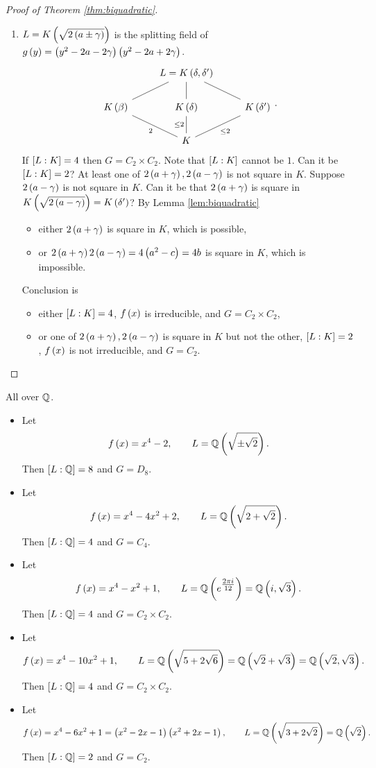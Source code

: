 \begin{proof}[Proof of Theorem \ref{thm:biquadratic}]
\begin{enumerate}
\item $ L = K\rb{\sqrt{2\rb{a \pm \gamma}}} $ is the splitting field of $ g\rb{y} = \rb{y^2 - 2a - 2\gamma}\rb{y^2 - 2a + 2\gamma} $.
$$
\begin{tikzcd}
& L = K\rb{\delta, \delta'} & \\
K\rb{\beta} \arrow[dash]{ur} & K\rb{\delta} \arrow[dash]{u} & K\rb{\delta'} \arrow[dash, swap]{ul} \\
& K \arrow[dash]{ul}{2} \arrow[dash]{u}{\le 2} \arrow[dash, swap]{ur}{\le 2} &
\end{tikzcd}.
$$
If $ \sb{L : K} = 4 $ then $ G = C_2 \times C_2 $. Note that $ \sb{L : K} $ cannot be $ 1 $. Can it be $ \sb{L : K} = 2 $? At least one of $ 2\rb{a + \gamma}, 2\rb{a - \gamma} $ is not square in $ K $. Suppose $ 2\rb{a - \gamma} $ is not square in $ K $. Can it be that $ 2\rb{a + \gamma} $ is square in $ K\rb{\sqrt{2\rb{a - \gamma}}} = K\rb{\delta'} $? By Lemma \ref{lem:biquadratic}
\begin{itemize}
\item either $ 2\rb{a + \gamma} $ is square in $ K $, which is possible,
\item or $ 2\rb{a + \gamma}2\rb{a - \gamma} = 4\rb{a^2 - c} = 4b $ is square in $ K $, which is impossible.
\end{itemize}
Conclusion is
\begin{itemize}
\item either $ \sb{L : K} = 4 $, $ f\rb{x} $ is irreducible, and $ G = C_2 \times C_2 $,
\item or one of $ 2\rb{a + \gamma}, 2\rb{a - \gamma} $ is square in $ K $ but not the other, $ \sb{L : K} = 2 $, $ f\rb{x} $ is not irreducible, and $ G = C_2 $.
\end{itemize}
\end{enumerate}
\end{proof}

\begin{example*}
All over $ \Q $.
\begin{itemize}
\item Let
$$ f\rb{x} = x^4 - 2, \qquad L = \Q\rb{\sqrt{\pm\sqrt{2}}}. $$
Then $ \sb{L : \Q} = 8 $ and $ G = D_8 $.
\item Let
$$ f\rb{x} = x^4 - 4x^2 + 2, \qquad L = \Q\rb{\sqrt{2 + \sqrt{2}}}. $$
Then $ \sb{L : \Q} = 4 $ and $ G = C_4 $.
\item Let
$$ f\rb{x} = x^4 - x^2 + 1, \qquad L = \Q\rb{e^{\tfrac{2\pi i}{12}}} = \Q\rb{i, \sqrt{3}}. $$
Then $ \sb{L : \Q} = 4 $ and $ G = C_2 \times C_2 $.
\item Let
$$ f\rb{x} = x^4 - 10x^2 + 1, \qquad L = \Q\rb{\sqrt{5 + 2\sqrt{6}}} = \Q\rb{\sqrt{2} + \sqrt{3}} = \Q\rb{\sqrt{2}, \sqrt{3}}. $$
Then $ \sb{L : \Q} = 4 $ and $ G = C_2 \times C_2 $.
\item Let
$$ f\rb{x} = x^4 - 6x^2 + 1 = \rb{x^2 - 2x - 1}\rb{x^2 + 2x - 1}, \qquad L = \Q\rb{\sqrt{3 + 2\sqrt{2}}} = \Q\rb{\sqrt{2}}. $$
Then $ \sb{L : \Q} = 2 $ and $ G = C_2 $.
\end{itemize}
\end{example*}

